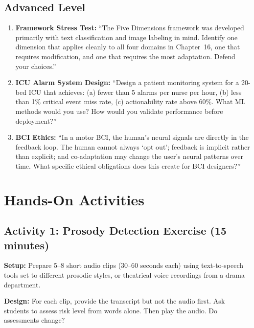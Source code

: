 \subsection{Advanced Level}

\begin{enumerate}
    \item \textbf{Framework Stress Test:} ``The Five Dimensions framework was developed primarily with text classification and image labeling in mind. Identify one dimension that applies cleanly to all four domains in Chapter~16, one that requires modification, and one that requires the most adaptation. Defend your choices.''

    \item \textbf{ICU Alarm System Design:} ``Design a patient monitoring system for a 20-bed ICU that achieves: (a) fewer than 5 alarms per nurse per hour, (b) less than 1\% critical event miss rate, (c) actionability rate above 60\%. What ML methods would you use? How would you validate performance before deployment?''

    \item \textbf{BCI Ethics:} ``In a motor BCI, the human's neural signals are directly in the feedback loop. The human cannot always `opt out'; feedback is implicit rather than explicit; and co-adaptation may change the user's neural patterns over time. What specific ethical obligations does this create for BCI designers?''
\end{enumerate}

\section{Hands-On Activities}

\subsection{Activity 1: Prosody Detection Exercise (15 minutes)}

\textbf{Setup:} Prepare 5--8 short audio clips (30--60 seconds each) using text-to-speech tools set to different prosodic styles, or theatrical voice recordings from a drama department.

\textbf{Design:} For each clip, provide the transcript but not the audio first. Ask students to assess risk level from words alone. Then play the audio. Do assessments change?

